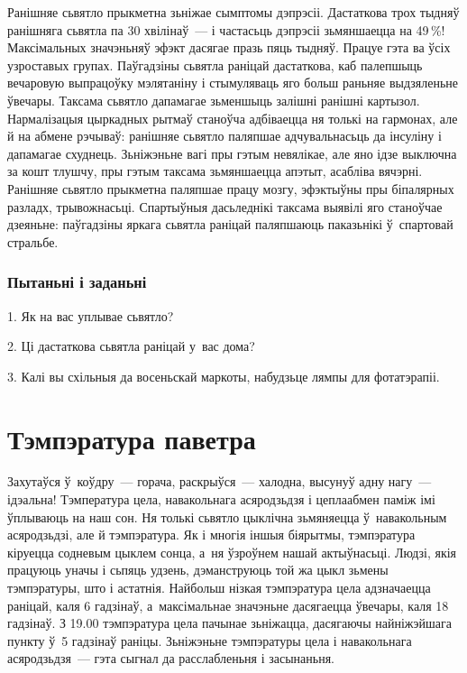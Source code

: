 Ранішняе сьвятло прыкметна зьніжае сымптомы дэпрэсіі. Дастаткова трох тыдняў ранішняга сьвятла па 30 хвілінаў~--- і частасьць дэпрэсіі зьмяншаецца на 49\,\%! Максімальных значэньняў эфэкт дасягае празь пяць тыдняў. Працуе гэта ва ўсіх узроставых групах. Паўгадзіны сьвятла раніцай дастаткова, каб палепшыць вечаровую выпрацоўку мэлятаніну і стымуляваць яго больш раньняе выдзяленьне ўвечары. Таксама сьвятло дапамагае зьменшыць залішні ранішні картызол. Нармалізацыя цыркадных рытмаў станоўча адбіваецца ня толькі на гармонах, але й на абмене рэчываў: ранішняе сьвятло паляпшае адчувальнасьць да інсуліну і дапамагае схуднець. Зьніжэньне вагі пры гэтым невялікае, але яно ідзе выключна за кошт тлушчу, пры гэтым таксама зьмяншаецца апэтыт, асабліва вячэрні. Ранішняе сьвятло прыкметна паляпшае працу мозгу, эфэктыўны пры біпалярных разладх, трывожнасьці. Спартыўныя дасьледнікі таксама выявілі яго станоўчае дзеяньне: паўгадзіны яркага сьвятла раніцай паляпшаюць паказьнікі ў~спартовай стральбе.

\subsubsection{Пытаньні і заданьні}

1. Як на вас уплывае сьвятло?

2. Ці дастаткова сьвятла раніцай у~вас дома?

3. Калі вы схільныя да восеньскай маркоты, набудзьце лямпы для фотатэрапіі.


\section{Тэмпэратура паветра}

Захутаўся ў~коўдру~--- горача, раскрыўся~--- халодна, высунуў адну нагу~--- ідэальна! Тэмпература цела, навакольнага асяродзьдзя і цеплаабмен паміж імі ўплываюць на наш сон. Ня толькі сьвятло цыклічна зьмяняецца ў~навакольным асяродзьдзі, але й тэмпэратура. Як і многія іншыя біярытмы, тэмпэратура кіруецца содневым цыклем сонца, а~ня ўзроўнем нашай актыўнасьці. Людзі, якія працуюць уначы і сьпяць удзень, дэманструюць той жа цыкл зьмены тэмпэратуры, што і астатнія. Найбольш нізкая тэмпэратура цела адзначаецца раніцай, каля 6 гадзінаў, а~максімальнае значэньне дасягаецца ўвечары, каля 18 гадзінаў. З 19.00 тэмпэратура цела пачынае зьніжацца, дасягаючы найніжэйшага пункту ў~5 гадзінаў раніцы. Зьніжэньне тэмпэратуры цела і навакольнага асяродзьдзя~--- гэта сыгнал да расслабленьня і засынаньня.

